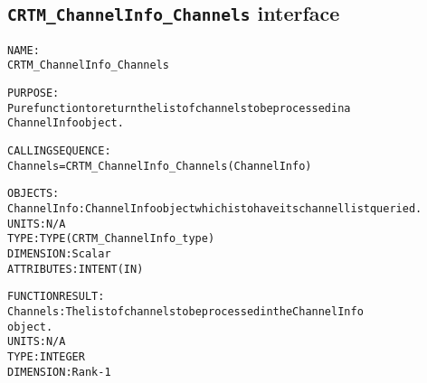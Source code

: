 \subsection{\texttt{CRTM\_ChannelInfo\_Channels} interface}
  \label{sec:CRTM_ChannelInfo_Channels_interface}
  \begin{alltt}
 
  NAME:
        CRTM_ChannelInfo_Channels
 
  PURPOSE:
        Pure function to return the list of channels to be processed in a
        ChannelInfo object.
 
  CALLING SEQUENCE:
        Channels = CRTM_ChannelInfo_Channels( ChannelInfo )
 
  OBJECTS:
        ChannelInfo: ChannelInfo object which is to have its channel list queried.
                     UNITS:      N/A
                     TYPE:       TYPE(CRTM_ChannelInfo_type)
                     DIMENSION:  Scalar
                     ATTRIBUTES: INTENT(IN)
 
  FUNCTION RESULT:
        Channels:    The list of channels to be processed in the ChannelInfo
                     object.
                     UNITS:      N/A
                     TYPE:       INTEGER
                     DIMENSION:  Rank-1
 
  \end{alltt}
